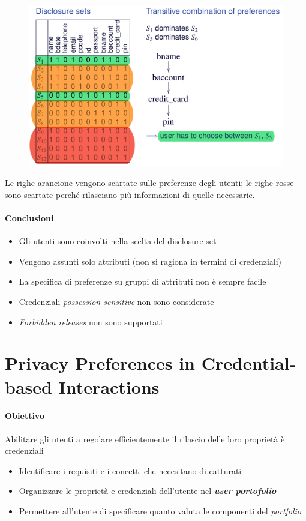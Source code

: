 \documentclass{report}
\begin{document}
\begin{figure}[ht]
    \centering
    \includegraphics[width=1\linewidth]{images/logic-ex.png}
\end{figure}

Le righe arancione vengono scartate sulle preferenze degli utenti; le righe rosse 
sono scartate perché rilasciano più informazioni di quelle necessarie.

\newpage
\subsubsection{Conclusioni}
\begin{itemize}
    \item Gli utenti sono coinvolti nella scelta del disclosure set
    \item Vengono assunti solo attributi (non si ragiona in termini di credenziali)
    \item La specifica di preferenze su gruppi di attributi non è sempre facile
    \item Credenziali \textit{possession-sensitive} non sono considerate
    \item \textit{Forbidden releases} non sono supportati
\end{itemize}

\chapter{Privacy Preferences in Credential-based Interactions}

\subsubsection{Obiettivo}
Abilitare gli utenti a regolare efficientemente il rilascio delle loro proprietà è credenziali 
\begin{itemize}
    \item Identificare i requisiti e i concetti che necesitano di catturati
    \item Organizzare le proprietà e credenziali dell'utente nel \textit{\textbf{user portofolio}}
    \item Permettere all'utente di specificare quanto valuta le componenti del \textit{portfolio} 
\end{itemize}
\end{document}
